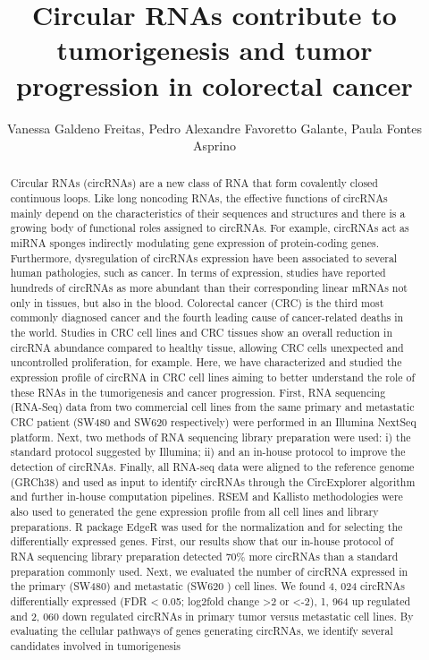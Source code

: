\documentclass[twoside]{article}
\title{\vspace{-15mm}\fontsize{24pt}{10pt}\selectfont\textbf{ Circular RNAs contribute to tumorigenesis and tumor progression in colorectal cancer }} %
\author{ Vanessa Galdeno Freitas, Pedro Alexandre Favoretto Galante, Paula Fontes Asprino }
\affil{ Interunidades em Bioinform\'atica - IME USP / Instituto de Ensino e Pesquisa S\'{\i}rio Liban\^es - IEP HSL }
\date{}
\begin{document}
  
  
  \maketitle %
  
  
  \thispagestyle{fancy} %
  
  
  \begin{abstract}
  Circular RNAs (circRNAs) are a new class of RNA that form covalently closed continuous loops. Like long noncoding RNAs,  the effective functions of circRNAs mainly depend on the characteristics of their sequences and structures and there is a growing body of functional roles assigned to circRNAs. For example,  circRNAs act as miRNA sponges indirectly modulating gene expression of protein-coding genes. Furthermore,  dysregulation of circRNAs expression have been associated to several human pathologies,  such as cancer. In terms of expression,  studies have reported hundreds of circRNAs as more abundant than their corresponding linear mRNAs not only in tissues,  but also in the blood. Colorectal cancer (CRC) is the third most commonly diagnosed cancer and the fourth leading cause of cancer-related deaths in the world. Studies in CRC cell lines and CRC tissues show an overall reduction in circRNA abundance compared to healthy tissue,  allowing CRC cells unexpected and uncontrolled proliferation,  for example. Here,  we have characterized and studied the expression profile of circRNA in CRC cell lines aiming to better understand the role of these RNAs in the tumorigenesis and cancer progression. First,  RNA sequencing (RNA-Seq) data from two commercial cell lines from the same primary and metastatic CRC patient (SW480 and SW620 respectively) were performed in an Illumina NextSeq platform. Next,  two methods of RNA sequencing library preparation were used: i) the standard protocol suggested by Illumina; ii) and an in-house protocol to improve the detection of circRNAs. Finally,  all RNA-seq data were aligned to the reference genome (GRCh38) and used as input to identify circRNAs through the CircExplorer algorithm and further in-house computation pipelines. RSEM and Kallisto methodologies were also used to generated the gene expression profile from all cell lines and library preparations. R package EdgeR was used for the normalization and for selecting the differentially expressed genes. First,  our results show that our in-house protocol of RNA sequencing library preparation detected 70\% more circRNAs than a standard preparation commonly used. Next,  we evaluated the number of circRNA expressed in the primary (SW480) and metastatic (SW620 ) cell lines. We found 4, 024 circRNAs differentially expressed (FDR < 0.05; log2fold change >2 or <-2),  1, 964 up regulated and 2, 060 down regulated circRNAs in primary tumor versus metastatic cell lines. By evaluating the cellular pathways of genes generating circRNAs,  we identify several candidates involved in tumorigenesis 
\end{abstract}
\end{document}
